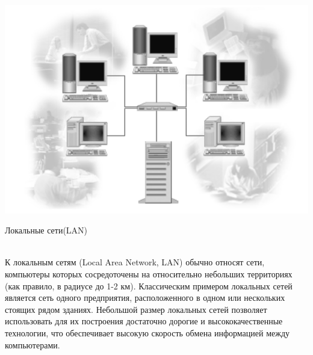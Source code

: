 \documentclass[a4paper,14pt]{extarticle}
\begin{document}
\centering
\includegraphics[width=0.75\linewidth]{n2.png}
\newline
\caption{Локальные сети(LAN)}\\
К локальным сетям (Local Area Network, LAN) обычно относят сети, компьютеры которых сосредоточены на относительно небольших территориях (как правило, в радиусе до 1-2 км). Классическим примером локальных сетей является сеть одного предприятия, расположенного в одном или нескольких стоящих рядом зданиях. Небольшой размер локальных сетей позволяет использовать для их построения достаточно дорогие и высококачественные технологии, что обеспечивает высокую скорость обмена информацией между компьютерами.
\end{document}
